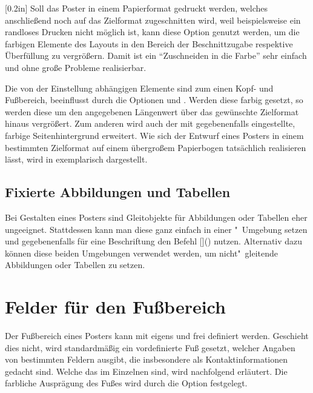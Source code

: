 \begin{Bundle*}{}
\begin{Declaration}{}[0.2in]
\printdeclarationlist%
%
%
%
Soll das Poster in einem Papierformat gedruckt werden, welches anschließend 
noch auf das Zielformat zugeschnitten wird, weil beispielsweise ein randloses 
Drucken nicht möglich ist, kann diese Option genutzt werden, um die farbigen 
Elemente des Layouts in den Bereich der Beschnittzugabe respektive Überfüllung 
zu vergrößern. Damit ist ein \enquote{Zuschneiden in die Farbe} sehr einfach 
und ohne große Probleme realisierbar.

Die von der Einstellung  abhängigen 
Elemente sind zum einen Kopf- und Fußbereich, beeinflusst durch die Optionen 
 und . Werden diese farbig gesetzt, so werden 
diese um den angegebenen Längenwert über das gewünschte Zielformat hinaus 
vergrößert. Zum anderen wird auch der mit  gegebenenfalls 
eingestellte, farbige Seitenhintergrund erweitert. Wie sich der Entwurf eines 
Posters in einem bestimmten Zielformat auf einem übergroßem Papierbogen 
tatsächlich realisieren lässt, wird in  exemplarisch 
dargestellt.
\end{Declaration}



\subsection{Fixierte Abbildungen und Tabellen}

\begin{Declaration}[v2.06f]{}
\begin{Declaration}[v2.06f]{}
\printdeclarationlist%
%
Bei Gestalten eines Posters sind Gleitobjekte für Abbildungen oder Tabellen 
eher ungeeignet. Stattdessen kann man diese ganz einfach in einer 
"~Umgebung setzen und gegebenenfalls für eine 
Beschriftung den Befehl %
[]() nutzen. 
Alternativ dazu können diese beiden Umgebungen verwendet werden, um 
nicht"~gleitende Abbildungen oder Tabellen zu setzen.
\end{Declaration}
\end{Declaration}



\section{Felder für den Fußbereich}
%
%
Der Fußbereich eines Posters kann mit  eigens und frei 
definiert werden. Geschieht dies nicht, wird standardmäßig ein vordefinierte 
Fuß gesetzt, welcher Angaben von bestimmten Feldern ausgibt, die insbesondere 
als Kontaktinformationen gedacht sind. Welche das im Einzelnen sind, wird 
nachfolgend erläutert. Die farbliche Ausprägung des Fußes wird durch die Option
 festgelegt.


\end{Bundle*}
